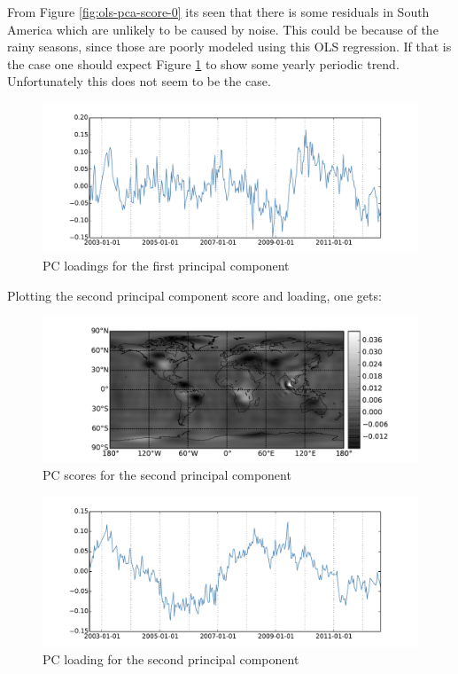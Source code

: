 From Figure \ref{fig:ols-pca-score-0} its seen that there is some residuals in South America which are unlikely to be caused by noise. This could be because of the rainy seasons, since those are poorly modeled using this OLS regression. If that is the case one should expect Figure \ref{fig:ols-pca-loading-0} to show some yearly periodic trend. Unfortunately this does not seem to be the case. 

\begin{figure}[H]
\centering
\includegraphics[width=1.0\textwidth]{figures/ols-pca-loading-0}
\caption{PC loadings for the first principal component}
\label{fig:ols-pca-loading-0}
\end{figure}

Plotting the second principal component score and loading, one gets:
\begin{figure}[H]
\centering
\includegraphics[width=1.0\textwidth]{figures/ols-pca-score-1}
\caption{PC scores for the second principal component}
\label{fig:ols-pca-score-1}
\end{figure}

\begin{figure}[H]
\centering
\includegraphics[width=1.0\textwidth]{figures/ols-pca-loading-1}
\caption{PC loading for the second principal component}
\label{fig:ols-pca-loading-1}
\end{figure}


